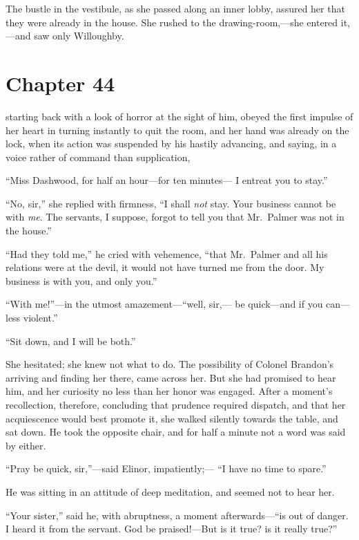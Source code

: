 The bustle in the vestibule, as she passed along
an inner lobby, assured her that they were already
in the house.  She rushed to the drawing-room,---she
entered it,---and saw only Willoughby.



\chapter{Chapter 44}


 starting back with a look of horror at
the sight of him, obeyed the first impulse of her heart
in turning instantly to quit the room, and her hand
was already on the lock, when its action was suspended
by his hastily advancing, and saying, in a voice rather
of command than supplication,

``Miss Dashwood, for half an hour---for ten minutes---%
I entreat you to stay.''

``No, sir,'' she replied with firmness, ``I shall \emph{not} stay.
Your business cannot be with \emph{me}.  The servants, I suppose,
forgot to tell you that Mr.\ Palmer was not in the house.''

``Had they told me,'' he cried with vehemence,
``that Mr.\ Palmer and all his relations were at the devil,
it would not have turned me from the door.  My business
is with you, and only you.''

``With me!''---in the utmost amazement---``well, sir,---%
be quick---and if you can---less violent.''

``Sit down, and I will be both.''

She hesitated; she knew not what to do.  The possibility
of Colonel Brandon's arriving and finding her there,
came across her.  But she had promised to hear him,
and her curiosity no less than her honor was engaged.
After a moment's recollection, therefore, concluding that
prudence required dispatch, and that her acquiescence would
best promote it, she walked silently towards the table,
and sat down.  He took the opposite chair, and for half
a minute not a word was said by either.

``Pray be quick, sir,''---said Elinor, impatiently;---%
``I have no time to spare.''

He was sitting in an attitude of deep meditation,
and seemed not to hear her.

``Your sister,'' said he, with abruptness, a moment
afterwards---``is out of danger.  I heard it from the servant.
God be praised!---But is it true? is it really true?''


